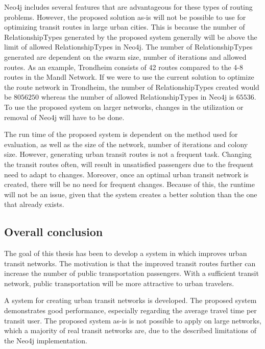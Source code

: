 Neo4j includes several features that are advantageous for these types of routing problems. However, the proposed solution as-is will not be possible to use for optimizing transit routes in large urban cities. This is because the number of RelationshipTypes generated by the proposed system generally will be above the limit of allowed RelationshipTypes in Neo4j. The number of RelationshipTypes generated are dependent on the swarm size, number of iterations and allowed routes. As an example, Trondheim consists of 42 routes compared to the 4-8 routes in the Mandl Network. If we were to use the current solution to optimize the route network in Trondheim, the number of RelationshipTypes created would be $8056250$ whereas the number of allowed RelationshipTypes in Neo4j is $65536$. To use the proposed system on larger networks, changes in the utilization or removal of Neo4j will have to be done. 

The run time of the proposed system is dependent on the method used for evaluation, as well as the size of the network, number of iterations and colony size. However, generating urban transit routes is not a frequent task. Changing the transit routes often, will result in unsatisfied passengers due to the frequent need to adapt to changes. Moreover, once an optimal urban transit network is created, there will be no need for frequent changes. Because of this, the runtime will not be an issue, given that the system creates a better solution than the one that already exists. 

\subsection*{Overall conclusion}
The goal of this thesis has been to develop a system in which improves urban transit networks. The motivation is that the improved transit routes further can increase the number of public transportation passengers. With a sufficient transit network, public transportation will be more attractive to urban travelers.

A system for creating urban transit networks is developed. The proposed system demonstrates good performance, especially regarding the average travel time per transit user. The proposed system as-is is not possible to apply on large networks, which a majority of real transit networks are, due to the described limitations of the Neo4j implementation. 
